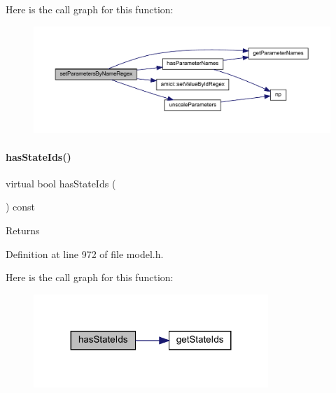 Here is the call graph for this function\+:
\nopagebreak
\begin{figure}[H]
\begin{center}
\leavevmode
\includegraphics[width=350pt]{classamici_1_1_model_a1307ed45ccda80e84174d6b495c85d8d_cgraph}
\end{center}
\end{figure}
\mbox{\label{classamici_1_1_model_aa249cbfe9223101f4492ace0b14e4eab}} 
\paragraph{\texorpdfstring{has\+State\+Ids()}{hasStateIds()}}
{\footnotesize\ttfamily virtual bool has\+State\+Ids (\begin{DoxyParamCaption}{ }\end{DoxyParamCaption}) const\hspace{0.3cm}{\ttfamily [virtual]}}

\begin{DoxyReturn}{Returns}

\end{DoxyReturn}


Definition at line 972 of file model.\+h.

Here is the call graph for this function\+:
\nopagebreak
\begin{figure}[H]
\begin{center}
\leavevmode
\includegraphics[width=251pt]{classamici_1_1_model_aa249cbfe9223101f4492ace0b14e4eab_cgraph}
\end{center}
\end{figure}
\mbox{\label{classamici_1_1_model_a8a93b9fcddaaa762dacc654ffc379af1}} 
